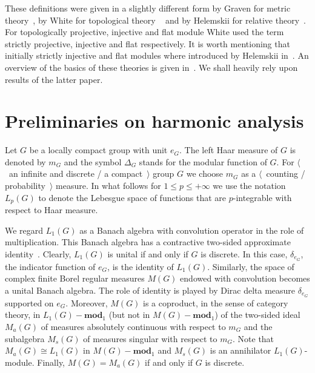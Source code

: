 \documentclass{article}
\theoremstyle{plain}
\theoremstyle{definition}
\newcommand{\isom}{\mathop{\mathbin{\cong}}}
\begin{document}
\begin{fulltext}
These definitions were given in a slightly different form by Graven for metric
theory~\cite{GravInjProjBanMod}, by White for topological theory
~\cite{WhiteInjmoduAlg} and by Helemskii for relative
theory~\cite{HelemHomolDimNorModBanAlg}. For topologically projective, injective
and flat module White used the term strictly projective, injective and flat
respectively. It is worth mentioning that initially strictly injective and flat
modules where introduced by Helemskii in~\cite[section
VII.1]{HelBanLocConvAlg}. An overview of the basics of these theories is given
in~\cite{NemGeomProjInjFlatBanMod}. We shall heavily rely upon results of the
latter paper.



\section{Preliminaries on harmonic
    analysis}\label{SectionPreliminariesOnHarmonicAnalysis} 

Let $G$ be a locally compact group with unit $e_G$. The left Haar measure of $G$
is denoted by $m_G$ and the symbol $\Delta_G$ stands for the modular function of
$G$. For $\langle$~an infinite and discrete / a  compact~$\rangle$ group $G$ we
choose $m_G$ as a $\langle$~counting / probability~$\rangle$ measure. In what
follows for $1\leq p\leq+\infty$ we use the notation $L_p(G)$ to denote the
Lebesgue space of functions that are $p$-integrable with respect to Haar
measure.

We regard $L_1(G)$ as a Banach algebra with convolution operator in the role of
multiplication. This Banach algebra has a contractive two-sided approximate
identity~\cite[theorem 3.3.23]{DalBanAlgAutCont}. Clearly, $L_1(G)$ is unital
if and only if $G$ is discrete. In this case, $\delta_{e_G}$, the indicator
function of $e_G$, is the identity of $L_1(G)$. Similarly, the space of complex
finite Borel regular measures $M(G)$ endowed with convolution becomes a unital
Banach algebra. The role of identity is played by Dirac delta measure
$\delta_{e_G}$ supported on $e_G$. Moreover, $M(G)$ is a coproduct, in the sense
of category theory, in $L_1(G)-\mathbf{mod}_1$ (but not in
$M(G)-\mathbf{mod}_1$) of the two-sided ideal $M_a(G)$ of measures absolutely
continuous with respect to $m_G$ and the subalgebra $M_s(G)$ of measures
singular with respect to $m_G$. Note that $M_a(G)\isom L_1(G)$ in
$M(G)-\mathbf{mod}_1$ and $M_s(G)$ is an annihilator $L_1(G)$-module. Finally,
$M(G)=M_a(G)$ if and only if $G$ is discrete. 


\end{fulltext}
\end{document}
